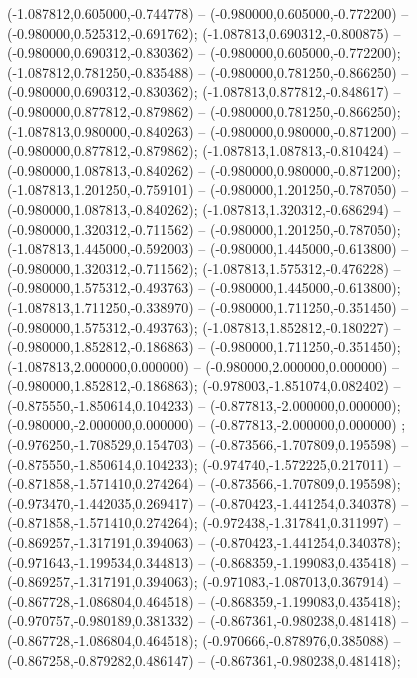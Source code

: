  (-1.087812,0.605000,-0.744778) -- (-0.980000,0.605000,-0.772200) -- (-0.980000,0.525312,-0.691762);
 (-1.087813,0.690312,-0.800875) -- (-0.980000,0.690312,-0.830362) -- (-0.980000,0.605000,-0.772200);
 (-1.087812,0.781250,-0.835488) -- (-0.980000,0.781250,-0.866250) -- (-0.980000,0.690312,-0.830362);
 (-1.087813,0.877812,-0.848617) -- (-0.980000,0.877812,-0.879862) -- (-0.980000,0.781250,-0.866250);
 (-1.087813,0.980000,-0.840263) -- (-0.980000,0.980000,-0.871200) -- (-0.980000,0.877812,-0.879862);
 (-1.087813,1.087813,-0.810424) -- (-0.980000,1.087813,-0.840262) -- (-0.980000,0.980000,-0.871200);
 (-1.087813,1.201250,-0.759101) -- (-0.980000,1.201250,-0.787050) -- (-0.980000,1.087813,-0.840262);
 (-1.087813,1.320312,-0.686294) -- (-0.980000,1.320312,-0.711562) -- (-0.980000,1.201250,-0.787050);
 (-1.087813,1.445000,-0.592003) -- (-0.980000,1.445000,-0.613800) -- (-0.980000,1.320312,-0.711562);
 (-1.087813,1.575312,-0.476228) -- (-0.980000,1.575312,-0.493763) -- (-0.980000,1.445000,-0.613800);
 (-1.087813,1.711250,-0.338970) -- (-0.980000,1.711250,-0.351450) -- (-0.980000,1.575312,-0.493763);
 (-1.087813,1.852812,-0.180227) -- (-0.980000,1.852812,-0.186863) -- (-0.980000,1.711250,-0.351450);
 (-1.087813,2.000000,0.000000) -- (-0.980000,2.000000,0.000000) -- (-0.980000,1.852812,-0.186863);
 (-0.978003,-1.851074,0.082402) -- (-0.875550,-1.850614,0.104233) -- (-0.877813,-2.000000,0.000000);
 (-0.980000,-2.000000,0.000000) -- (-0.877813,-2.000000,0.000000) ;
 (-0.976250,-1.708529,0.154703) -- (-0.873566,-1.707809,0.195598) -- (-0.875550,-1.850614,0.104233);
 (-0.974740,-1.572225,0.217011) -- (-0.871858,-1.571410,0.274264) -- (-0.873566,-1.707809,0.195598);
 (-0.973470,-1.442035,0.269417) -- (-0.870423,-1.441254,0.340378) -- (-0.871858,-1.571410,0.274264);
 (-0.972438,-1.317841,0.311997) -- (-0.869257,-1.317191,0.394063) -- (-0.870423,-1.441254,0.340378);
 (-0.971643,-1.199534,0.344813) -- (-0.868359,-1.199083,0.435418) -- (-0.869257,-1.317191,0.394063);
 (-0.971083,-1.087013,0.367914) -- (-0.867728,-1.086804,0.464518) -- (-0.868359,-1.199083,0.435418);
 (-0.970757,-0.980189,0.381332) -- (-0.867361,-0.980238,0.481418) -- (-0.867728,-1.086804,0.464518);
 (-0.970666,-0.878976,0.385088) -- (-0.867258,-0.879282,0.486147) -- (-0.867361,-0.980238,0.481418);
